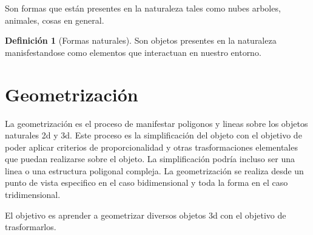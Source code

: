 \documentclass[16pt,]{krantz}
\theoremstyle{definition}
\newtheorem{definition}{Definición}[chapter]
\theoremstyle{definition}
\theoremstyle{definition}
\theoremstyle{definition}
\theoremstyle{remark}
\begin{document}
Son formas que están presentes en la naturaleza tales como nubes arboles, animales, cosas en general.

\begin{definition}[Formas naturales]
\protect\hypertarget{def:formasnaturales}{}{\label{def:formasnaturales} {} }Son objetos presentes en la naturaleza manisfestandose como elementos que interactuan en nuestro entorno.
\end{definition}

\hypertarget{geometrizaciuxf3n}{%
\section{Geometrización}\label{geometrizaciuxf3n}}

La geometrización es el proceso de manifestar poligonos y lineas sobre los objetos naturales 2d y 3d. Este proceso es la simplificación del objeto con el objetivo de poder aplicar criterios de proporcionalidad y otras trasformaciones elementales que puedan realizarse sobre el objeto. La simplificación podría incluso ser una linea o una estructura poligonal compleja. La geometrización se realiza desde un punto de vista especifico en el caso bidimensional y toda la forma en el caso tridimensional.

El objetivo es aprender a geometrizar diversos objetos 3d con el objetivo de trasformarlos.
\end{document}
